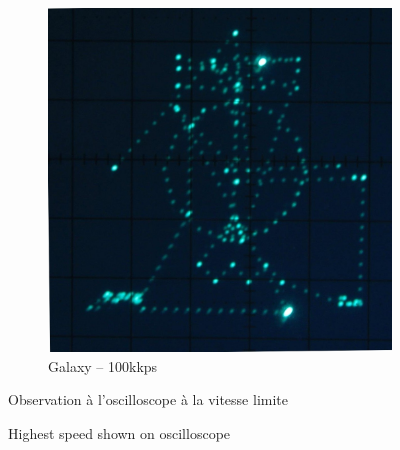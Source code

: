 \begin{figure}[ht]
\begin{bigcenter}
\begin{subfigure}[b]{0.5\textwidth}
                \includegraphics[width=\textwidth]{images/comp/galaxy_100k.jpg}
                \caption{Galaxy -- 100\unit{kkps}}
                \label{fig:galaxy_100k}
        \end{subfigure}       
	\end{bigcenter}
	\begin{fr}
	\caption{Observation à l'oscilloscope à la vitesse limite}
	\end{fr}
	\begin{en}
	\caption{Highest speed shown on oscilloscope}
	\end{en}
\label{fig:test_osc_limit}
\end{figure}



